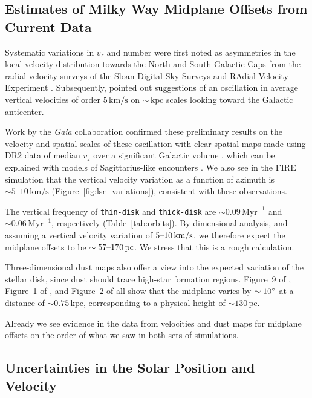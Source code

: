 \documentclass[twocolumn]{aastex62}
\newcommand{\pc}{\text{pc}}
\newcommand{\kpc}{\text{kpc}}
\newcommand{\Myr}{\text{Myr}}
\newcommand{\kms}{\text{km}/\text{s}}
\newcommand{\thin}{\texttt{thin-disk}}
\newcommand{\thick}{\texttt{thick-disk}}
\begin{document}
\subsection{Estimates of Milky Way Midplane Offsets from Current Data}
\label{ssec:mw_data_midplane}

Systematic variations in $v_z$ and number were first noted as asymmetries in the local
velocity distribution towards the North and South Galactic Caps from the
radial velocity surveys of the Sloan Digital Sky Surveys
\citep{2012ApJ...750L..41W} and RAdial Velocity Experiment
\citep{2013MNRAS.436..101W}. Subsequently, \citet{2013ApJ...777L...5C} pointed
out suggestions of an oscillation in average vertical velocities of order
$5\,\kms$ on $\sim\,\kpc$ scales looking toward the Galactic anticenter.

Work
by the \textit{Gaia} collaboration confirmed these preliminary results on the
velocity and spatial scales of these oscillation with clear spatial maps made
using DR2 data of median $v_z$ over a significant Galactic volume
\citep{2018A&A...616A..11G, 2019arXiv190209569F}, which can be explained with models of Sagittarius-like encounters \citep{2013MNRAS.429..159G,2018MNRAS.481..286L,2019MNRAS.485.3134L}. We also see in the FIRE
simulation that the vertical velocity variation as a function of azimuth is
$\sim5\text{--}10\,\kms$ (Figure~\ref{fig:lsr_variations}), consistent with
these observations.

The vertical frequency of \thin{} and \thick{} are $\sim
0.09\,\Myr^{-1}$ and $\sim0.06\,\Myr^{-1}$, respectively (Table~\ref{tab:orbits}). By dimensional
analysis, and assuming a vertical velocity variation of $5\textup{--}10\,\kms$, we
therefore expect the midplane offsets to be $\sim 57\textup{--}170\,\pc$. We
stress that this is a rough calculation.

Three-dimensional dust maps also offer a view into the expected variation of
the stellar disk, since dust should trace high-star formation regions.
Figure~9 of \citet{2019MNRAS.483.4277C}, Figure~1 of
\citet{2019arXiv190105971L}, and Figure~2 of \citet{2019arXiv190502734G} all
show that the midplane varies by $\sim10\degree$ at a distance of
$\sim0.75\,\kpc$, corresponding to a physical height of $\sim130\,\pc$.

Already we see evidence in the data from velocities and dust maps for midplane
offsets on the order of what we saw in both sets of simulations.

\subsection{Uncertainties in the Solar Position and Velocity}\label{ssec:coord_off}
\end{document}

